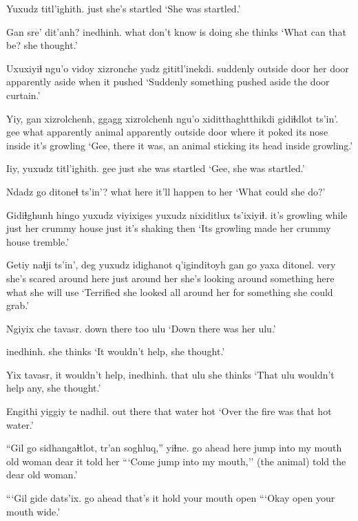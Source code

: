 \documentclass[12pt]{article}
\begin{document}
\gll Yuxudz titl'ighith.
just {she's startled}
\glt `She was startled.'
\glend

\gll Gan sre' dit'anh? inedhinh.
what {don't know} {is doing} {she thinks}
\glt `What can that be? she thought.'
\glend

\gll Uxuxiyiɬ ngu'o vidoy xizronche yadz gititl'inekdi.
suddenly {outside door} {her door} apparently aside {when it pushed}
\glt `Suddenly something pushed aside the door curtain.'
\glend

\gll Yiy, gan xizrolchenh, ggagg xizrolchenh ngu'o xiditthaghtthikdi gidiɬdlot ts'in'.
gee what apparently animal apparently {outside door} {where it poked its nose inside} {it's growling} {}
\glt `Gee, there it was, an animal sticking its head inside growling.'
\glend

\gll Iiy, yuxudz titl'ighith. 
gee just {she was startled} 
\glt `Gee, she was startled.' 
\glend

\gll  Ndadz go ditoneɬ ts'in'?
what here {it'll happen to her} {}
\glt `What could she do?'
\glend

\gll Gidiɬghunh hingo yuxudz viyixiges yuxudz nixiditlux ts'ixiyiɬ.
{it's growling} while just {her crummy house} just {it's shaking} then
\glt `Its growling made her crummy house tremble.'
\glend

\gll Getiy naɬji ts'in', deg yuxudz idighanot q'iginditoyh gan go {yaxa ditonel.}
very {she's scared} {} {around here} just {around her} {she's looking around} something here {what she will use}
\glt `Terrified she looked all around her for something she could grab.'
\glend

\gll Ngiyix che tavasr.
{down there} too ulu
\glt `Down there was her ulu.'
\glend

 inedhinh.
{} {she thinks}
\glt `It wouldn't help, she thought.'
\glend

\gll Yix tavasr, {it wouldn't help,} inedhinh.
that ulu {} {she thinks}
\glt `That ulu wouldn't help any, she thought.'
\glend

\gll Engithi yiggiy te nadhil.
{out there} that water hot
\glt `Over the fire was that hot water.'
\glend

\gll ``Gil go sidhangaɬtlot, tr'an soghluq,'' yiɬne.
{go ahead} here {jump into my mouth} {old woman} dear {it told her}
\glt ```Come jump into my mouth,'' (the animal) told the dear old woman.'
\glend

\gll ```Gil gide dats'ix. 
{go ahead} {that's it} {hold your mouth open}
\glt ```Okay open your mouth wide.' 
\glend
\end{document}
